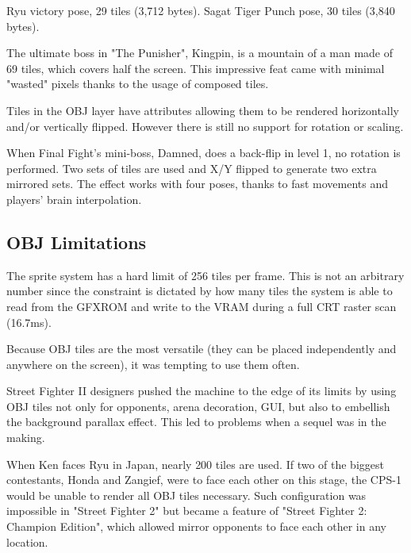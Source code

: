 Ryu victory pose, 29 tiles (3,712 bytes). Sagat Tiger Punch pose, 30 tiles (3,840 bytes). 




The ultimate boss in "The Punisher", Kingpin, is a mountain of a man made of 69 tiles, which covers half the screen. This impressive feat came with minimal "wasted" pixels thanks to the usage of composed tiles.


Tiles in the OBJ layer have attributes allowing them to be rendered horizontally and/or vertically flipped. However there is still no support for rotation or scaling.

\begin{minipage}[t]{0.535\linewidth}
\end{minipage}%
\hfill%
\begin{minipage}[t]{0.445\linewidth}
\end{minipage}

 When Final Fight's  mini-boss, Damned, does a back-flip in level 1, no rotation is performed. Two sets of tiles are used and X/Y flipped to generate two extra mirrored sets. The effect works with four poses, thanks to fast movements and players' brain interpolation.

\pagebreak

\subsection{OBJ Limitations}
The sprite system has a hard limit of 256 tiles per frame. This is not an arbitrary number since the constraint is dictated by how many tiles the system is able to read from the GFXROM and write to the VRAM during a full CRT raster scan (16.7ms).

Because OBJ tiles are the most versatile (they can be placed independently and anywhere on the screen), it was tempting to use them often.

Street Fighter II designers pushed the machine to the edge of its limits by using OBJ tiles not only for opponents, arena decoration, GUI, but also to embellish the background parallax effect. This led to problems when a sequel was in the making.

When Ken faces Ryu in Japan, nearly 200 tiles are used. If two of the biggest contestants, Honda and Zangief, were to face each other on this stage, the CPS-1 would be unable to render all OBJ tiles necessary. Such configuration was impossible in "Street Fighter 2" but became a feature of "Street Fighter 2: Champion Edition",  which allowed mirror opponents to face each other in any location.
\vfill
{}



